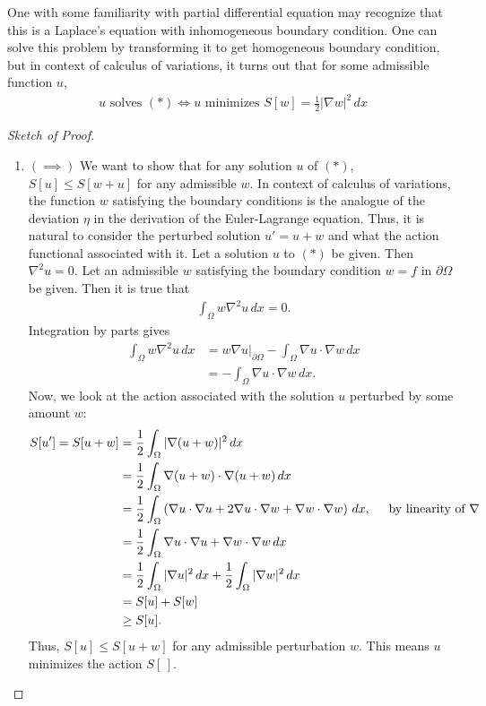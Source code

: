 \documentclass{article}
\newcommand{\p}{\partial}
\newcommand{\f}[2]{\frac{#1}{#2}}
\newcommand{\lp}{\left(}
\newcommand{\rp}{\right)}
\begin{document}
One with some familiarity with partial differential equation may recognize that this is a Laplace's equation with inhomogeneous boundary condition. One can solve this problem by transforming it to get homogeneous boundary condition, but in context of calculus of variations, it turns out that for some admissible function $u$,
\begin{align}
\boxed{\text{$u$ solves $(\ast)$} \iff \text{$u$ minimizes $S[w] = \frac{1}{2}\vert \nabla w\vert^2\,dx$}} 
\end{align}
\begin{proof}[Sketch of Proof]
	$\,$
	\begin{enumerate}
		\item $(\implies)$ We want to show that for any solution $u$ of $(\ast)$, $S[u] \leq S[w+u]$ for any admissible $w$. In context of calculus of variations, the function $w$ satisfying the boundary conditions is the analogue of the deviation $\eta$ in the derivation of the Euler-Lagrange equation. Thus, it is natural to consider the perturbed solution $u' = u + w$ and what the action functional associated with it. Let a solution $u$ to $(\ast)$ be given. Then $\nabla^2u = 0$. Let an admissible $w$ satisfying the boundary condition $w = f$ in $\p \Omega$ be given. Then it is true that
		\begin{align}
		\int_\Omega w\nabla^2 u\,dx = 0.
		\end{align}
		Integration by parts gives
		\begin{align}
		\int_\Omega w\nabla^2 u\,dx &= w\nabla u\bigg\vert_{\p\Omega} - \int_\Omega \nabla u \cdot \nabla w\,dx \nonumber \\
		&= - \int_\Omega \nabla u \cdot \nabla w\,dx.
		\end{align}
		Now, we look at the action associated with the solution $u$ perturbed by some amount $w$: 
		\begin{align}
		S[u'] = S[u+w] &= \f{1}{2}\int_\Omega \vert \nabla(u+w) \vert^2\,dx \nonumber \\
		&=  \f{1}{2}\int_\Omega \nabla(u+w) \cdot \nabla(u+w)\,dx \nonumber \\
		&= \f{1}{2}\int_\Omega \lp\nabla u \cdot \nabla u + 2 \nabla u \cdot \nabla w + \nabla w \cdot \nabla w \rp \,dx\nonumber, \hspace{0.5cm}\text{by linearity of $\nabla$}\\
		&= \f{1}{2}\int_\Omega \nabla u \cdot \nabla u + \nabla w \cdot \nabla w\,dx\nonumber\\
		&= \f{1}{2}\int_\Omega \vert \nabla u \vert^2\,dx + \f{1}{2}\int_\Omega \vert \nabla w \vert^2\,dx\nonumber\\
		&= S[u] + S[w]\nonumber\\
		&\geq S[u].
		\end{align}
		Thus, $S[u] \leq S[u + w]$ for any admissible perturbation $w$. This means $u$ minimizes the action $S[\,]$.
		

\end{enumerate}
\end{proof}
\end{document}
